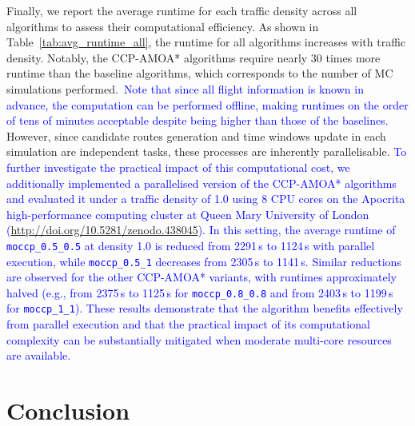 \documentclass{article}
\newcommand*{\blue}{\textcolor{blue}}
\begin{document}
Finally, we report the average runtime for each traffic density across all algorithms to assess their computational efficiency. As shown in Table~\ref{tab:avg_runtime_all}, the runtime for all algorithms increases with traffic density. Notably, the CCP-AMOA* algorithms require nearly 30 times more runtime than the baseline algorithms, which corresponds to the number of MC simulations performed.~\blue{Note that since all flight information is known in advance, the computation can be performed offline, making runtimes on the order of tens of minutes acceptable despite being higher than those of the baselines.} However, since candidate routes generation and time windows update in each simulation are independent tasks, these processes are inherently parallelisable. \blue{To further investigate the practical impact of this computational cost, we additionally implemented a parallelised version of the CCP-AMOA* algorithms and evaluated it under a traffic density of 1.0 using 8 CPU cores on the Apocrita high-performance computing cluster at Queen Mary University of London (\url{http://doi.org/10.5281/zenodo.438045}). In this setting, the average runtime of \texttt{moccp\_0.5\_0.5} at density 1.0 is reduced from 2291\,s to 1124\,s with parallel execution, while \texttt{moccp\_0.5\_1} decreases from 2305\,s to 1141\,s. Similar reductions are observed for the other CCP-AMOA* variants, with runtimes approximately halved (e.g., from 2375\,s to 1125\,s for \texttt{moccp\_0.8\_0.8} and from 2403\,s to 1199\,s for \texttt{moccp\_1\_1}). These results demonstrate that the algorithm benefits effectively from parallel execution and that the practical impact of its computational complexity can be substantially mitigated when moderate multi-core resources are available.}
\section{Conclusion}
\end{document}
